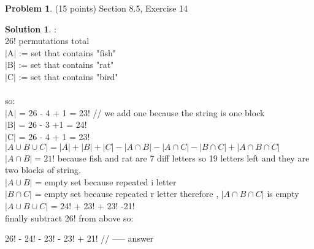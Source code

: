 \documentclass{article}
\theoremstyle{definition}
\newtheorem{problem}{Problem}
\newtheorem*{solution}{Solution}
\begin{document}
\newpage

\begin{problem} (15 points) Section 8.5, Exercise 14
\end{problem}
\begin{solution} : 
\\
26! permutations total \\ 
$|$A$|$ := set that contains "fish"\\
$|$B$|$ := set that contains "rat"\\
$|$C$|$ := set that contains "bird"\\ 
\\
so: \\
$|$A$|$ = 26 - 4 + 1 = 23! // we add one because the string is one block
\\
$|$B$|$ = 26 - 3 +1 = 24!
\\
$|$C$|$ = 26 - 4 + 1 = 23! \\

$| A \cup B \cup C | = |A| + |B| + |C| - |A\cap B| - |A \cap C| - |B \cap C| + |A\cap B \cap C| $ \\

$|A \cap B| = 21!$ because fish and rat are 7 diff letters so 19 letters left and they are two blocks of string.
\\
$|A\cup B|$ = empty set because repeated i letter
\\
$|B \cap C|$ = empty set because repeated r letter therefore , $|A\cap B \cap C|$  is empty
\\

$| A \cup B \cup C | $ = 24! + 23! + 23! -21!
\\
finally subtract 26! from above so:

26! - 24! - 23! - 23! + 21!  //  ----- answer
\end{solution}

\newpage
\end{document}

